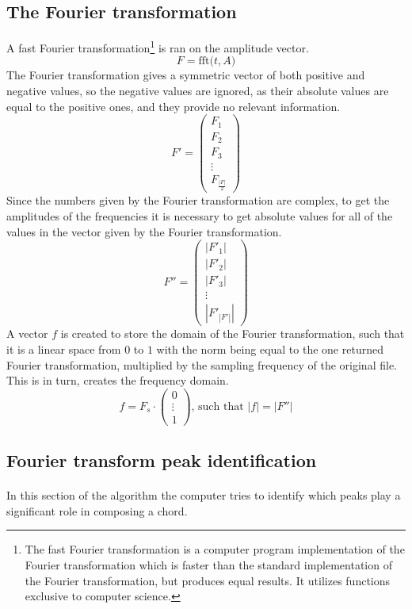 \documentclass{article}
\begin{document}
\subsection{The Fourier transformation}
A fast Fourier transformation\footnote{The fast Fourier transformation is a 
computer program implementation of the Fourier transformation which is faster
than the standard implementation of the Fourier transformation, but produces 
equal results. It utilizes functions exclusive to computer science.} is ran on 
the amplitude vector.
$$F = \text{fft(}t, A\text{)}$$
The Fourier transformation gives a symmetric vector of both positive and 
negative values, so the negative values are ignored, as their absolute values 
are equal to the positive ones, and they provide no relevant information.
$$F' =
\begin{pmatrix}
	F_1 \\
	F_2 \\
	F_3 \\
	\vdots \\
	F_{\frac{|F|}{2}}
\end{pmatrix}
$$
Since the numbers given by the Fourier transformation are complex, to get the 
amplitudes of the frequencies it is necessary to get absolute values for all 
of the values in the vector given by the Fourier transformation.
$$F'' = 
\begin{pmatrix}
	|F'_1| \\
	|F'_2| \\
	|F'_3| \\
	\vdots \\
	|F'_{|F'|}|
\end{pmatrix}
$$
A vector $f$ is created to store the domain of the Fourier transformation, 
such that it is a linear space from $0$ to $1$ with the norm being equal to 
the one returned Fourier transformation, multiplied by the sampling frequency 
of the original file. This is in turn, creates the frequency domain.
$$f = F_s \cdot
\begin{pmatrix}
	0 \\
	\vdots \\
	1
\end{pmatrix}\text{, such that $|f| = |F''|$}
$$

\subsection{Fourier transform peak identification} 
\paragraph*{}
In this section of the algorithm the computer tries to identify which peaks 
play a significant role in composing a chord. 
\end{document}
